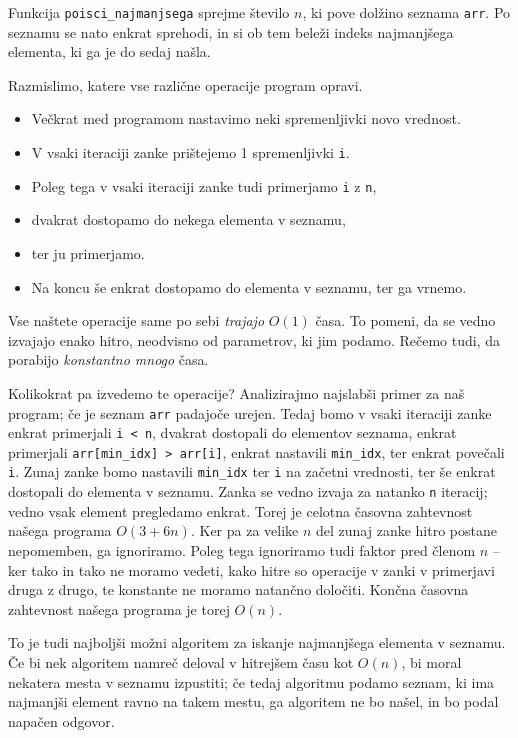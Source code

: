 \documentclass{book}
\begin{document}
Funkcija \verb+poisci_najmanjsega+ sprejme število \(n\), ki pove dolžino seznama
\verb+arr+. Po seznamu se nato enkrat sprehodi, in si ob tem beleži indeks
najmanjšega elementa, ki ga je do sedaj našla.

Razmislimo, katere vse različne operacije program opravi.
\begin{itemize}
  \item 
	Večkrat med programom nastavimo neki spremenljivki novo vrednost.
  \item
	V vsaki iteraciji zanke prištejemo 1 spremenljivki \verb+i+.
  \item
	Poleg tega v vsaki iteraciji zanke tudi primerjamo \verb+i+ z \verb+n+,
  \item
	dvakrat dostopamo do nekega elementa v seznamu,
  \item
	ter ju primerjamo.
  \item
	Na koncu še enkrat dostopamo do elementa v seznamu, ter ga vrnemo.
\end{itemize}

Vse naštete operacije same po sebi \emph{trajajo} \(O(1)\) časa. To pomeni, da
se vedno izvajajo enako hitro, neodvisno od parametrov, ki jim podamo. Rečemo
tudi, da porabijo \emph{konstantno mnogo} časa.

Kolikokrat pa izvedemo te operacije? Analizirajmo najslabši primer za naš
program; če je seznam \verb+arr+ padajoče urejen. Tedaj bomo v vsaki iteraciji
zanke enkrat primerjali \verb+i < n+, dvakrat dostopali do elementov seznama,
enkrat primerjali \verb+arr[min_idx] > arr[i]+, enkrat nastavili \verb+min_idx+,
ter enkrat povečali \verb+i+. Zunaj zanke bomo nastavili \verb+min_idx+ ter
\verb+i+ na začetni vrednosti, ter še enkrat dostopali do elementa v seznamu.
Zanka se vedno izvaja za natanko \verb+n+ iteracij; vedno vsak element pregledamo
enkrat. Torej je celotna časovna zahtevnost našega programa \(O(3 + 6n)\).
Ker pa za velike \(n\) del zunaj zanke hitro postane nepomemben, ga ignoriramo.
Poleg tega ignoriramo tudi faktor pred členom \(n\) -- ker tako in tako ne moramo
vedeti, kako hitre so operacije v zanki v primerjavi druga z drugo, te konstante
ne moramo natančno določiti. Končna časovna zahtevnost našega programa je torej
\(O(n)\).

To je tudi najboljši možni algoritem za iskanje najmanjšega elementa v seznamu.
Če bi nek algoritem namreč deloval v hitrejšem času kot \(O(n)\), bi moral
nekatera mesta v seznamu izpustiti; če tedaj algoritmu podamo seznam, ki ima
najmanjši element ravno na takem mestu, ga algoritem ne bo našel, in bo podal
napačen odgovor.
\end{document}
